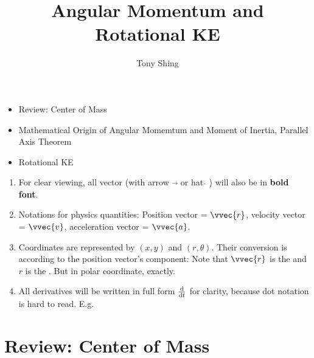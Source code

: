 \documentclass[class=article, crop=false, 12pt]{standalone}
\author{Tony Shing}
\title{Angular Momentum and Rotational KE}
\begin{document}
\maketitle


\begin{overview}
    \begin{itemize}
        \item Review: Center of Mass
        \item Mathematical Origin of Angular Momemtum and Moment of Inertia, Parallel Axis Theorem
        \item Rotational KE
    \end{itemize}
\end{overview}


\begin{notation}
    \begin{enumerate}
        \item For clear viewing, all vector (with arrow $\vec{}$ or hat $\hat{}$ ) will also be in \textbf{bold font}.
        \item Notations for physics quantities: Position vector = $\vvec{r}$, velocity vector = $\vvec{v}$, acceleration vector = $\vvec{a}$.
        \item Coordinates are represented by $(x,y)$ and $(r,\theta)$. Their conversion is according to the position vector's component: 
        Note that $\vvec{r}$ is the  and $r$ is the . 
        But in polar coordinate,  exactly.
        \item All derivatives will be written in full form $\dv{}{t}$ for clarity, because dot notation is hard to read. E.g. 
    \end{enumerate}
\end{notation}


\setcounter{section}{-1}
\section{Review: Center of Mass}
\end{document}
